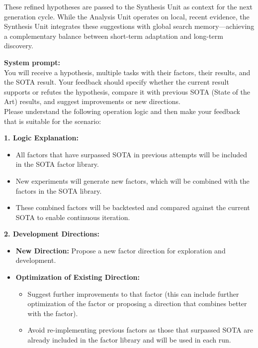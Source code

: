\documentclass{article}
\begin{document}
These refined hypotheses are passed to the Synthesis Unit as context for the next generation cycle. While the Analysis Unit operates on local, recent evidence, the Synthesis Unit integrates these suggestions with global search memory—achieving a complementary balance between short-term adaptation and long-term discovery.

\begin{tcolorbox}[
  colback=gray!5, 
  colframe=gray!80,
  title style={fontupper=\bfseries\large},
  title=Analysis Prompt – Factor-Oriented,
  breakable]

\textcolor{blue!60!black}{\textbf{System prompt:}}\\

You will receive a hypothesis, multiple tasks with their factors, their results, and the SOTA result. Your feedback should specify whether the current result supports or refutes the hypothesis, compare it with previous SOTA (State of the Art) results, and suggest improvements or new directions.\\

Please understand the following operation logic and then make your feedback that is suitable for the scenario:

\textbf{1. Logic Explanation:}
\begin{itemize}
  \item[a)] All factors that have surpassed SOTA in previous attempts will be included in the SOTA factor library.
  \item[b)] New experiments will generate new factors, which will be combined with the factors in the SOTA library.
  \item[c)] These combined factors will be backtested and compared against the current SOTA to enable continuous iteration.
\end{itemize}

\textbf{2. Development Directions:}
\begin{itemize}
  \item[a)] \textbf{New Direction:} Propose a new factor direction for exploration and development.
  \item[b)] \textbf{Optimization of Existing Direction:}
    \begin{itemize}
      \item Suggest further improvements to that factor (this can include further optimization of the factor or proposing a direction that combines better with the factor).
      \item Avoid re-implementing previous factors as those that surpassed SOTA are already included in the factor library and will be used in each run.
    \end{itemize}
\end{itemize}


\end{tcolorbox}
\end{document}
